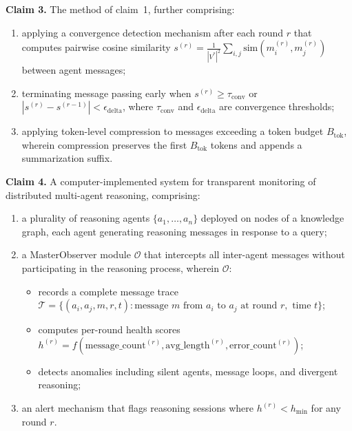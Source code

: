 \documentclass[a4paper,12pt]{article}
\begin{document}
\noindent\textbf{Claim 3.} The method of claim~1, further comprising:

\begin{enumerate}[label=(\alph*),nosep,leftmargin=2em]
\item applying a convergence detection mechanism after each round $r$ that computes pairwise cosine similarity $s^{(r)} = \frac{1}{|V^*|^2} \sum_{i,j} \mathrm{sim}(m_i^{(r)}, m_j^{(r)})$ between agent messages;
\item terminating message passing early when $s^{(r)} \geq \tau_{\mathrm{conv}}$ or $|s^{(r)} - s^{(r-1)}| < \epsilon_{\mathrm{delta}}$, where $\tau_{\mathrm{conv}}$ and $\epsilon_{\mathrm{delta}}$ are convergence thresholds;
\item applying token-level compression to messages exceeding a token budget $B_{\mathrm{tok}}$, wherein compression preserves the first $B_{\mathrm{tok}}$ tokens and appends a summarization suffix.
\end{enumerate}

\bigskip


\noindent\textbf{Claim 4.} A computer-implemented system for transparent monitoring of distributed multi-agent reasoning, comprising:

\begin{enumerate}[label=(\alph*),nosep,leftmargin=2em]
\item a plurality of reasoning agents $\{a_1, \ldots, a_n\}$ deployed on nodes of a knowledge graph, each agent generating reasoning messages in response to a query;
\item a MasterObserver module $\mathcal{O}$ that intercepts all inter-agent messages without participating in the reasoning process, wherein $\mathcal{O}$:
  \begin{itemize}[nosep,leftmargin=1.5em]
  \item records a complete message trace $\mathcal{T} = \{(a_i, a_j, m, r, t) : \text{message } m \text{ from } a_i \text{ to } a_j \text{ at round } r, \text{ time } t\}$;
  \item computes per-round health scores $h^{(r)} = f(\text{message\_count}^{(r)}, \text{avg\_length}^{(r)}, \text{error\_count}^{(r)})$;
  \item detects anomalies including silent agents, message loops, and divergent reasoning;
  \end{itemize}
\item an alert mechanism that flags reasoning sessions where $h^{(r)} < h_{\min}$ for any round $r$.
\end{enumerate}
\end{document}
